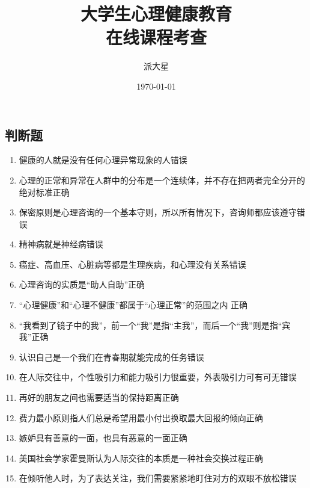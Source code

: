 \documentclass{article}
\title{大学生心理健康教育 \\ {在线课程考查}}
\author{派大星}
\date{\today}
\begin{document}
		\maketitle
	\subsection*{判断题}
	\begin{enumerate}
		\item 健康的人就是没有任何心理异常现象的人\hfill 错误
		
		\item 心理的正常和异常在人群中的分布是一个连续体，并不存在把两者完全分开的绝对标准\hfill 正确
		
		\item 保密原则是心理咨询的一个基本守则，所以所有情况下，咨询师都应该遵守\hfill 错误

		\item 精神病就是神经病\hfill 错误

		\item 癌症、高血压、心脏病等都是生理疾病，和心理没有关系\hfill 错误

		\item 心理咨询的实质是“助人自助”\hfill 正确

		\item “心理健康”和“心理不健康”都属于“心理正常”的范围之内 \hfill 正确

		\item “我看到了镜子中的我”，前一个“我”是指“主我”，而后一个“我”则是指“宾我”\hfill 正确

		\item 认识自己是一个我们在青春期就能完成的任务\hfill 错误
		
		\item 在人际交往中，个性吸引力和能力吸引力很重要，外表吸引力可有可无\hfill 错误
		
		\item 再好的朋友之间也需要适当的保持距离\hfill 正确
		
		\item 费力最小原则指人们总是希望用最小付出换取最大回报的倾向\hfill 正确
		
		\item 嫉妒具有善意的一面，也具有恶意的一面\hfill 正确
		
		\item 美国社会学家霍曼斯认为人际交往的本质是一种社会交换过程\hfill 正确
		
		\item 在倾听他人时，为了表达关注，我们需要紧紧地盯住对方的双眼不放松\hfill 错误
		

\end{enumerate}
\end{document}
